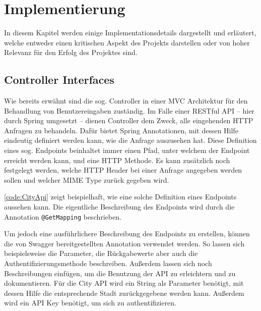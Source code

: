 \chapter{Implementierung}\label{sec:implementierung}

	In diesem Kapitel werden einige Implementationsdetails dargestellt und erläutert, welche entweder einen kritischen Aspekt des Projekts darstellen oder von hoher Relevanz für den Erfolg des Projektes sind. 
	
	\section{Controller Interfaces}
	
		Wie bereits erwähnt sind die sog. Controller in einer \acs{MVC} Architektur für den Behandlung von Benutzereingaben zuständig. Im Falle einer \acs{REST}ful \acs{API} -- hier durch Spring umgesetzt -- dienen Controller dem Zweck, alle eingehenden \acs{HTTP} Anfragen zu behandeln. Dafür bietet Spring Annotationen, mit dessen Hilfe eindeutig definiert werden kann, wie die Anfrage auszusehen hat. Diese Definition eines sog. Endpoints beinhaltet immer einen Pfad, unter welchem der Endpoint erreicht werden kann, und eine \acs{HTTP} Methode. Es kann zusätzlich noch festgelegt werden, welche \acs{HTTP} Header bei einer Anfrage angegeben werden sollen und welcher \acs{MIME} Type zurück gegeben wird.
		
		\autoref{code:CityApi} zeigt beispielhaft, wie eine solche Definition eines Endpoints aussehen kann. Die eigentliche Beschreibung des Endpoints wird durch die Annotation \lstinline|@GetMapping| beschrieben. 	
		
		Um jedoch eine ausführlichere Beschreibung des Endpoints zu erstellen, können die von Swagger bereitgestellten Annotation verwendet werden. So lassen sich beispielsweise die Parameter, die Rückgabewerte aber auch die Authentifizierungsmethode beschreiben. Außerdem lassen sich noch Beschreibungen einfügen, um die Benutzung der \acs{API} zu erleichtern und zu dokumentieren. Für die City \acs{API} wird ein String als Parameter benötigt, mit dessen Hilfe die entsprechende Stadt zurückgegebene werden kann. Außerdem wird ein \acs{API} Key benötigt, um sich zu authentifizieren. 
		
		
		
